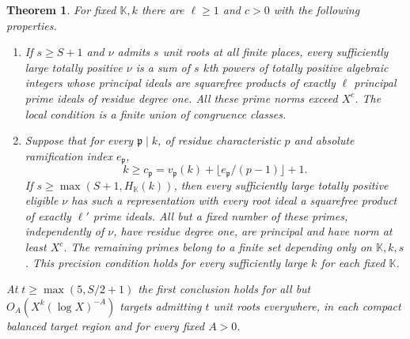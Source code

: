 \documentclass[11pt,letterpaper]{article}
\newtheorem{theorem}{Theorem}[section]
\theoremstyle{definition}
\numberwithin{equation}{section}
\begin{document}
\begin{theorem}\label{thm:nf-almost-primes}
For fixed $\mathbb K,k$ there are $\ell\ge1$ and $c>0$ with the
following properties.
\begin{enumerate}
\item If $s\ge S+1$ and $\nu$ admits $s$ unit roots at all finite
places, every sufficiently large totally positive $\nu$ is a sum
of $s$ $k$th powers of totally positive algebraic integers whose
principal ideals are squarefree products of exactly $\ell$ principal
prime ideals of residue degree one. All these prime norms exceed
$X^c$. The local condition is a finite union of congruence classes.
\item Suppose that for every $\mathfrak p\mid k$, of residue
characteristic $p$ and absolute ramification index $e_{\mathfrak p}$,
\[
 k\ge c_{\mathfrak p}=v_{\mathfrak p}(k)
                +\lfloor e_{\mathfrak p}/(p-1)\rfloor+1 .
\]
If $s\ge\max(S+1,H_{\mathbb K}(k))$, then every sufficiently large
totally positive eligible $\nu$ has such a representation with every root ideal a
squarefree product of exactly $\ell'$ prime ideals. All but a fixed
number of these primes, independently of $\nu$, have residue degree
one, are principal and have norm at least $X^c$. The remaining primes
belong to a finite set depending only on $\mathbb K,k,s$.
This precision condition holds for every sufficiently large $k$ for
each fixed $\mathbb K$.
\end{enumerate}
At $t\ge\max(5,S/2+1)$ the first conclusion holds for all but
$O_A(X^k(\log X)^{-A})$ targets admitting $t$ unit roots everywhere,
in each compact balanced target region and for every fixed $A>0$.
\end{theorem}
\end{document}
